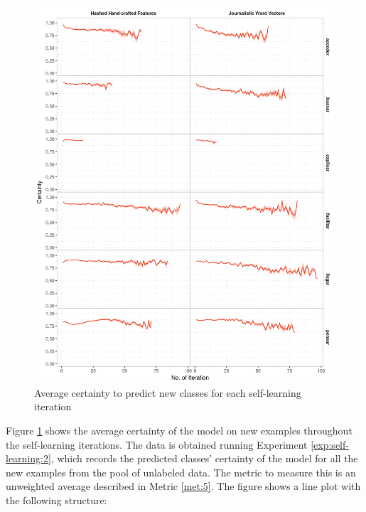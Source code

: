 \begin{figure}[htb!]
  \centering
  \includegraphics[height=.9\textheight,width=\textwidth,keepaspectratio]
    {plots/selflearning/certainty_progression}
  \caption{Average certainty to predict new classes for each self-learning
  iteration}
  \label{fig:self-learning:certainty}
\end{figure}

Figure \ref{fig:self-learning:certainty} shows the average certainty of the
model on new examples throughout the self-learning iterations. The data is
obtained running Experiment \ref{exp:self-learning:2}, which records the
predicted classes' certainty of the model for all the new examples from the
pool of unlabeled data. The metric to measure this is an unweighted average
described in Metric \ref{met:5}. The figure shows a line plot with the
following structure:

